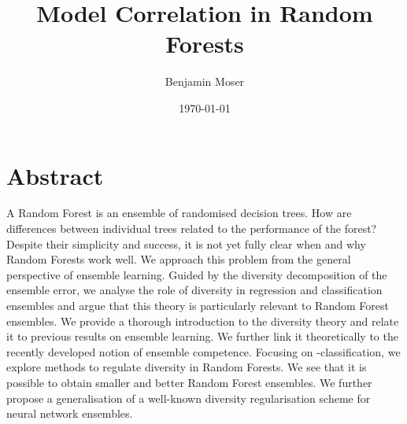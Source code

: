 \documentclass[
	twoside=false, %
]{kaobook}
\begin{document}

\title[Model Correlation in Random Forests]{Model Correlation in Random Forests}
\author[BM]{Benjamin Moser}
\date{\today}


\frontmatter %







\chapter*{Abstract}


A Random Forest is an ensemble of randomised decision trees. How are differences between individual trees related to the performance of the forest?
Despite their simplicity and success, it is not yet fully clear when and why Random Forests work well. We approach this problem from the general perspective of ensemble learning. Guided by the diversity decomposition of the ensemble error, we analyse the role of diversity in regression and classification ensembles and argue that this theory is particularly relevant to Random Forest ensembles. We provide a thorough introduction to the diversity theory and relate it to previous results on ensemble learning. We further link it theoretically to the recently developed notion of ensemble competence. Focusing on \zeroone-classification, we explore methods to regulate diversity in Random Forests. We see that it is possible to obtain smaller and better Random Forest ensembles. We further propose a generalisation of a well-known diversity regularisation scheme for neural network ensembles.
\end{document}
